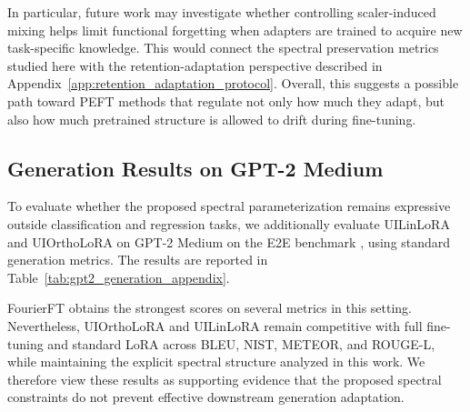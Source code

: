 \documentclass{article}
\begin{document}
In particular, future work may investigate whether controlling scaler-induced
mixing helps limit functional forgetting when adapters are trained to acquire
new task-specific knowledge. This would connect the spectral preservation
metrics studied here with the retention-adaptation perspective described in
Appendix~\ref{app:retention_adaptation_protocol}. Overall, this suggests a
possible path toward PEFT methods that regulate not only how much they adapt,
but also how much pretrained structure is allowed to drift during fine-tuning.

\subsection{Generation Results on GPT-2 Medium}
\label{app:gpt2_generation_results}

To evaluate whether the proposed spectral parameterization remains expressive outside classification and regression tasks, we additionally evaluate UILinLoRA and UIOrthoLoRA on GPT-2 Medium on the E2E benchmark \citep{novikova2017e2e}, using standard generation metrics. The results are reported in
Table~\ref{tab:gpt2_generation_appendix}.

FourierFT obtains the strongest scores on several metrics in this setting.
Nevertheless, UIOrthoLoRA and UILinLoRA remain competitive with full
fine-tuning and standard LoRA across BLEU, NIST, METEOR, and ROUGE-L, while
maintaining the explicit spectral structure analyzed in this work. We therefore
view these results as supporting evidence that the proposed spectral constraints
do not prevent effective downstream generation adaptation.
\end{document}
